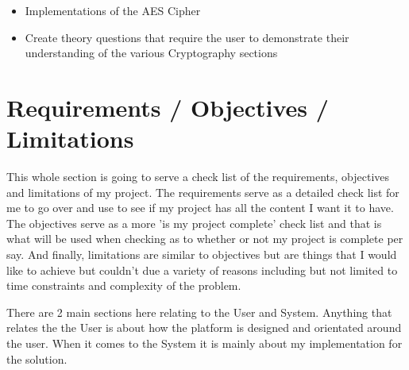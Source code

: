 \begin{itemize}
{\begin{itemize}
{\begin{itemize}
{\begin{itemize}
\item{Electronic Codebook Mode (ECB)}
\item{Cipher Block Chaining (CBC)}
\item{Output Feedback Mode (OFB)}
\item{Cipher Feedback Mode (CFB)}
\item{Counter Mode (CTR)}
\item{Galois Counter Mode (GCM)}
\end{itemize}}
\item{Stream Ciphers
\begin{itemize}
\item{Stream ciphers based off Linear Feedback Shift Register (LFSR)}
\end{itemize}}
\item{Hashing Functions
\begin{itemize}
\item{MD5}
\item{SHA-1}
\item{SHA-2}
\item{SHA-3}
\end{itemize}}
\end{itemize}}
\item{Implementations of the AES Cipher}
\item{Create theory questions that require the user to demonstrate their understanding of the various Cryptography sections}
\end{itemize}}
\end{itemize}

\section{Requirements / Objectives / Limitations}

This whole section is going to serve a check list of the requirements, objectives and limitations of my project. The requirements serve as a detailed check list for me to go over and use to see if my project has all the content I want it to have. The objectives serve as a more 'is my project complete' check list and that is what will be used when checking as to whether or not my project is complete per say. And finally, limitations are similar to objectives but are things that I would like to achieve but couldn't due a variety of reasons including but not limited to time constraints and complexity of the problem.

There are 2 main sections here relating to the User and System. Anything that relates the the User is about how the platform is designed and orientated around the user. When it comes to the System it is mainly about my implementation for the solution.

